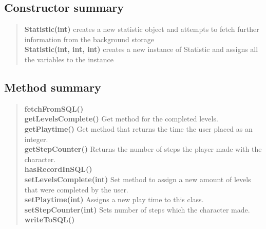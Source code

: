 \documentclass[11pt,a4paper]{report}
\begin{document}
{{{{{{\subsection{Constructor summary}{
\begin{verse}
{\bf Statistic(int)} creates a new statistic object and attempts to fetch further information from the background storage\\
{\bf Statistic(int, int, int)} creates a new instance of Statistic and assigns all the variables to the instance\\
\end{verse}
}
\subsection{Method summary}{
\begin{verse}
{\bf fetchFromSQL()} \\
{\bf getLevelsComplete()} Get method for the completed levels.\\
{\bf getPlaytime()} Get method that returns the time the user placed as an integer.\\
{\bf getStepCounter()} Returns the number of steps the player made with the character.\\
{\bf hasRecordInSQL()} \\
{\bf setLevelsComplete(int)} Set method to assign a new amount of levels that were completed by the user.\\
{\bf setPlaytime(int)} Assigns a new play time to this class.\\
{\bf setStepCounter(int)} Sets number of steps which the character made.\\
{\bf writeToSQL()} \\
\end{verse}
}
}}}}}}
\end{document}
